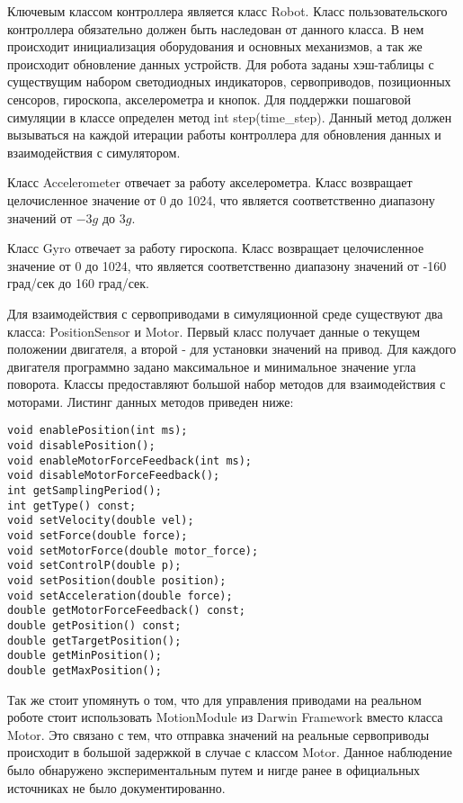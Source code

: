 Ключевым классом контроллера является класс Robot. Класс пользовательского контроллера обязательно должен быть наследован от данного класса. В нем происходит инициализация оборудования и основных механизмов, а так же происходит обновление данных устройств. Для робота заданы хэш-таблицы с существущим набором светодиодных индикаторов, сервоприводов, позиционных сенсоров, гироскопа, акселерометра и кнопок. Для поддержки пошаговой симуляции в классе определен метод int step(time\_step). Данный метод должен вызываться на каждой итерации работы контроллера для обновления данных и взаимодействия с симулятором.

Класс Accelerometer отвечает за работу акселерометра. Класс возвращает целочисленное значение от 0 до 1024, что является соответственно диапазону значений от $-3g$ до $3g$.

Класс Gyro отвечает за работу гироскопа. Класс возвращает целочисленное значение от 0 до 1024, что является соответственно диапазону значений от -160 град/сек до 160 град/сек.

Для взаимодействия с сервоприводами в симуляционной среде существуют два класса: PositionSensor и Motor. Первый класс получает данные о текущем положении двигателя, а второй - для установки значений на привод. Для каждого двигателя программно задано максимальное и минимальное значение угла поворота. Классы предоставляют большой набор методов для взаимодействия с моторами. Листинг данных методов приведен ниже:

\lstset{language=C++}
\begin{lstlisting}
void enablePosition(int ms);
void disablePosition();
void enableMotorForceFeedback(int ms);
void disableMotorForceFeedback();
int getSamplingPeriod();
int getType() const;
void setVelocity(double vel);
void setForce(double force);
void setMotorForce(double motor_force);
void setControlP(double p);
void setPosition(double position);
void setAcceleration(double force);
double getMotorForceFeedback() const;
double getPosition() const;
double getTargetPosition();
double getMinPosition();
double getMaxPosition();
\end{lstlisting}

Так же стоит упомянуть о том, что для управления приводами на реальном роботе стоит использовать MotionModule из Darwin Framework вместо класса Motor. Это связано с тем, что отправка значений на реальные сервоприводы происходит в большой задержкой в случае с классом Motor. Данное наблюдение было обнаружено экспериментальным путем и нигде ранее в официальных источниках не было документированно.

